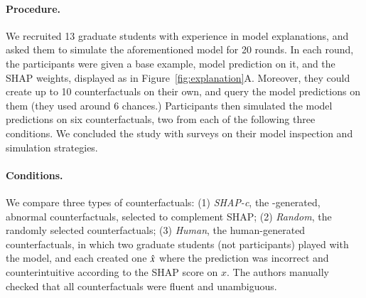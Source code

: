 \paragraph{Procedure.}
We recruited 13 graduate students with experience in model explanations, and asked them to simulate the aforementioned \qqp model for 20 rounds.
In each round, the participants were given a base example, model prediction on it, and the SHAP weights, displayed as in Figure~\ref{fig:explanation}A.
Moreover, they could create up to 10 counterfactuals on their own, and query the model predictions on them (they used around 6 chances.)
Participants then simulated the model predictions on six counterfactuals, two from each of the following three conditions.
We concluded the study with surveys on their model inspection and simulation strategies.



\newcommand{\cshap}{\emph{SHAP-c}\xspace}
\newcommand{\crandom}{\emph{Random}\xspace}
\newcommand{\chuman}{\emph{Human}\xspace}
\paragraph{Conditions.} 
We compare three types of counterfactuals:
(1) \cshap, the \sysname-generated, abnormal counterfactuals, selected to complement SHAP; 
(2) \crandom, the randomly selected \sysname counterfactuals; 
(3) \chuman, the human-generated counterfactuals, in which two graduate students (not participants) played with the model, and each created one $\hat{x}$ where the prediction was incorrect and counterintuitive according to the SHAP score on $x$.
The authors manually checked that all counterfactuals were fluent and unambiguous.

